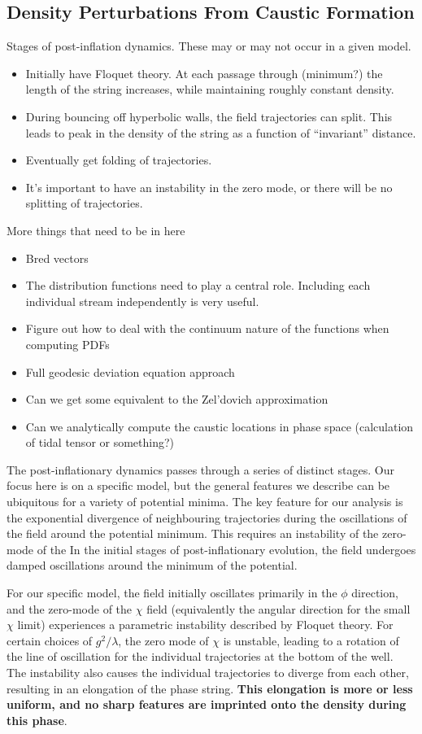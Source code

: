 \documentclass[11pt,a4paper]{article}
\begin{document}
\subsection{Density Perturbations From Caustic Formation}
Stages of post-inflation dynamics.  These may or may not occur in a given model.
\begin{itemize}
\item Initially have Floquet theory.  At each passage through (minimum?) the length of the string increases, while maintaining roughly constant density.
\item During bouncing off hyperbolic walls, the field trajectories can split.  This leads to peak in the density of the string as a function of ``invariant'' distance.
\item Eventually get folding of trajectories.
\item It's important to have an instability in the zero mode, or there will be no splitting of trajectories.
\end{itemize}

More things that need to be in here
\begin{itemize}
\item Bred vectors
\item The distribution functions need to play a central role.  Including each individual stream independently is very useful.
\item Figure out how to deal with the continuum nature of the functions when computing PDFs
\item Full geodesic deviation equation approach
\item Can we get some equivalent to the Zel'dovich approximation
\item Can we analytically compute the caustic locations in phase space (calculation of tidal tensor or something?)
\end{itemize}

The post-inflationary dynamics passes through a series of distinct stages.
Our focus here is on a specific model, but the general features we describe can be ubiquitous for a variety of potential minima.
The key feature for our analysis is the exponential divergence of neighbouring trajectories during the oscillations of the field around the potential minimum.
This requires an instability of the zero-mode of the 
In the initial stages of post-inflationary evolution, the field undergoes damped oscillations around the minimum of the potential.

For our specific model, the field initially oscillates primarily in the $\phi$ direction, and the zero-mode of the $\chi$ field (equivalently the angular direction for the small $\chi$ limit) experiences a parametric instability described by Floquet theory.
For certain choices of $g^2/\lambda$, the zero mode of $\chi$ is unstable, leading to a rotation of the line of oscillation for the individual trajectories at the bottom of the well.
The instability also causes the individual trajectories to diverge from each other, resulting in an elongation of the phase string.
{\bf This elongation is more or less uniform, and no sharp features are imprinted onto the density during this phase}.
\end{document}

